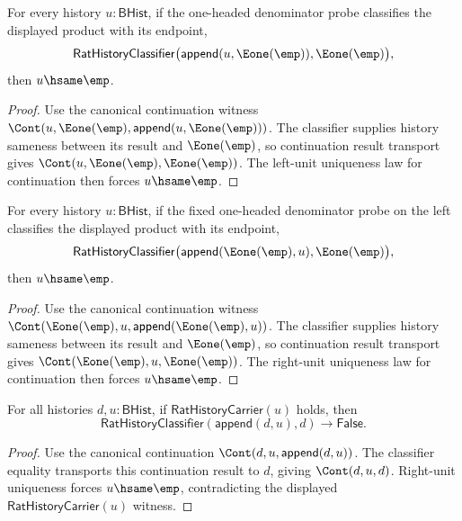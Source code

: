 \begin{theorem}
\label{thm:field-rat-denominator-e1-probe-classifier-endpoint-empty}
For every history $u:\mathsf{BHist}$, if the one-headed denominator probe
classifies the displayed product with its endpoint,
$$
\mathsf{RatHistoryClassifier}
\bigl(\mathsf{append}(u,\Eone(\emp)),\Eone(\emp)\bigr),
$$
then $u\hsame\emp$.
\end{theorem}
\begin{proof}
Use the canonical continuation witness
$\Cont(u,\Eone(\emp),\mathsf{append}(u,\Eone(\emp)))$. The classifier supplies
history sameness between its result and $\Eone(\emp)$, so continuation result
transport gives $\Cont(u,\Eone(\emp),\Eone(\emp))$. The left-unit uniqueness
law for continuation then forces $u\hsame\emp$.
\end{proof}

\begin{theorem}
\label{thm:field-rat-denominator-right-e1-probe-classifier-endpoint-empty}
For every history $u:\mathsf{BHist}$, if the fixed one-headed denominator probe
on the left classifies the displayed product with its endpoint,
$$
\mathsf{RatHistoryClassifier}
\bigl(\mathsf{append}(\Eone(\emp),u),\Eone(\emp)\bigr),
$$
then $u\hsame\emp$.
\end{theorem}
\begin{proof}
Use the canonical continuation witness
$\Cont(\Eone(\emp),u,\mathsf{append}(\Eone(\emp),u))$. The classifier supplies
history sameness between its result and $\Eone(\emp)$, so continuation result
transport gives $\Cont(\Eone(\emp),u,\Eone(\emp))$. The right-unit uniqueness
law for continuation then forces $u\hsame\emp$.
\end{proof}

\begin{theorem}
\label{thm:rat-history-classifier-append-right-carrier-absurd}
For all histories $d,u:\mathsf{BHist}$, if $\mathsf{RatHistoryCarrier}(u)$
holds, then
$$
\mathsf{RatHistoryClassifier}(\mathsf{append}(d,u),d)
\to \mathsf{False}.
$$
\end{theorem}
\begin{proof}
Use the canonical continuation
$\Cont(d,u,\mathsf{append}(d,u))$. The classifier equality transports this
continuation result to $d$, giving $\Cont(d,u,d)$. Right-unit uniqueness forces
$u\hsame\emp$, contradicting the displayed
$\mathsf{RatHistoryCarrier}(u)$ witness.
\end{proof}

